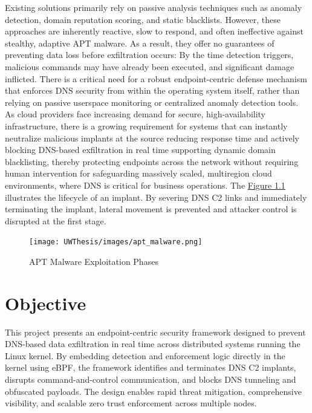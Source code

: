 \documentclass [11pt, proquest] {uwthesis}[2020/02/24]
\begin{document}
Existing solutions primarily rely on passive analysis techniques such as anomaly detection, domain reputation scoring, and static blacklists. However, these approaches are inherently reactive, slow to respond, and often ineffective against stealthy, adaptive APT malware. As a result, they offer no guarantees of preventing data loss before exfiltration occurs: By the time detection triggers, malicious commands may have already been executed, and significant damage inflicted.
There is a critical need for a robust endpoint-centric defense mechanism that enforces DNS security from within the operating system itself, rather than relying on passive userspace monitoring or centralized anomaly detection tools. As cloud providers face increasing demand for secure, high-availability infrastructure, there is a growing requirement for systems that can instantly neutralize malicious implants at the source reducing response time and actively blocking DNS-based exfiltration in real time supporting dynamic domain blacklisting, thereby protecting endpoints across the network without requiring human intervention for safeguarding massively scaled, multiregion cloud environments, where DNS is critical for business operations.
The \hyperref[sec:apt_malware_flow]{Figure 1.1} illustrates the lifecycle of an implant. By severing DNS C2 links and immediately terminating the implant, lateral movement is prevented and attacker control is disrupted at the first stage.
\begin{figure}[H]
\texttt{[image: UWThesis/images/apt\_malware.png]}
\caption{APT Malware Exploitation Phases}
\label{sec:apt_malware_flow}
\end{figure}

\section{Objective}
This project presents an endpoint-centric security framework designed to prevent DNS-based data exfiltration in real time across distributed systems running the Linux kernel. By embedding detection and enforcement logic directly in the kernel using eBPF, the framework identifies and terminates DNS C2 implants, disrupts command-and-control communication, and blocks DNS tunneling and obfuscated payloads. The design enables rapid threat mitigation, comprehensive visibility, and scalable zero trust enforcement across multiple nodes.
\end{document}
